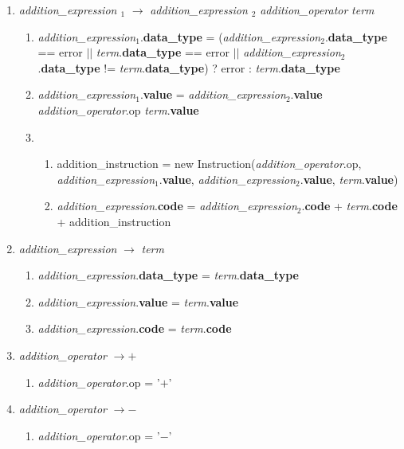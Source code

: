 \documentclass[12pt]{article}
\newcommand{\sub}[1]{$_{#1}$}
\begin{document}
\begin{enumerate}[label = \arabic*.]
\item \textit{ addition\_expression \sub{1}} $\rightarrow$ \textit{ addition\_expression \sub{2}} \textit{ addition\_operator } \textit{ term }
\begin{enumerate}[label = \roman*.]
\item \textit{addition\_expression}\sub{1}.\textbf{data\_type} = (\textit{addition\_expression}\sub{2}.\textbf{data\_type} == error $||$ \textit{term}.\textbf{data\_type} == error $||$ \textit{addition\_expression}\sub{2}.\textbf{data\_type} != \textit{term}.\textbf{data\_type}) ? error : \textit{term}.\textbf{data\_type}
\item \textit{addition\_expression}\sub{1}.\textbf{value} = \textit{addition\_expression}\sub{2}.\textbf{value} \textit{addition\_operator}.op \textit{term}.\textbf{value}
\item \begin{enumerate}[label = \alph*.]
\item addition\_instruction = new Instruction(\textit{addition\_operator}.op, \textit{addition\_expression}\sub{1}.\textbf{value}, \textit{addition\_expression}\sub{2}.\textbf{value}, \textit{term}.\textbf{value})
\item \textit{addition\_expression}.\textbf{code} = \textit{addition\_expression}\sub{2}.\textbf{code} + \textit{term}.\textbf{code} + addition\_instruction
\end{enumerate}
\end{enumerate}

\item \textit{ addition\_expression } $\rightarrow$ \textit{ term }
\begin{enumerate}[label = \roman*.]
\item \textit{addition\_expression}.\textbf{data\_type} = \textit{term}.\textbf{data\_type}
\item \textit{addition\_expression}.\textbf{value} = \textit{term}.\textbf{value}
\item \textit{addition\_expression}.\textbf{code} = \textit{term}.\textbf{code}
\end{enumerate}

\item \textit{ addition\_operator } $\rightarrow +$
\begin{enumerate}[label = \roman*.]
\item \textit{addition\_operator}.op = '$+$'
\end{enumerate}

\item \textit{ addition\_operator } $\rightarrow -$
\begin{enumerate}[label = \roman*.]
\item \textit{addition\_operator}.op = '$-$'
\end{enumerate}


\end{enumerate}
\end{document}
